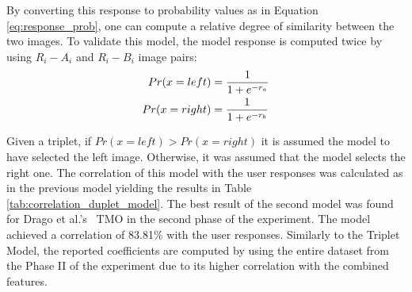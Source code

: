 By converting this response to probability values as in Equation \ref{eq:response_prob}, one can compute a relative degree of similarity between the two images. To validate this model, the model response is computed twice by using $R_i - A_i$ and $R_i - B_i$ image pairs:
\begin{align}
    Pr(x = left) &= {{1} \over {1 + e^{-r_a}}} \\
    Pr(x = right) &= {{1} \over {1 + e^{-r_b}}}
\end{align}


Given a triplet, if $Pr(x = left) > Pr(x =right)$ it is assumed the model to have selected the left image. Otherwise, it was assumed that the model selects the right one. The correlation of this model with the user responses was calculated as in the previous model yielding the results in Table \ref{tab:correlation_duplet_model}. The best result of the second model was found for Drago et al.’s~\cite{drago2003adaptive} TMO in the second phase of the experiment. The model achieved a correlation of 83.81\% with the user responses. Similarly to the Triplet Model, the reported coefficients are computed by using the entire dataset from the Phase II of the experiment due to its higher correlation with the combined features.

